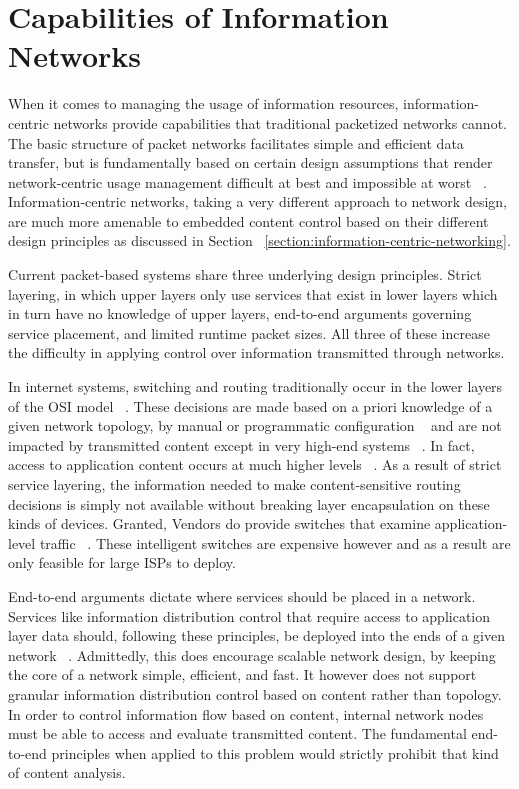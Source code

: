\section{Capabilities of Information Networks}
\label{section:capabilities}
When it comes to managing the usage of information resources,  information-centric networks provide capabilities that traditional packetized networks cannot.  The basic structure of packet networks facilitates simple and efficient data transfer, but is fundamentally based on certain design assumptions that render network-centric usage management difficult at best and impossible at worst ~\cite{Cl:88,SaReCl:84}.  Information-centric networks, taking a very different approach to network design, are much more amenable to embedded content control based on their different design principles as discussed in Section ~\ref{section:information-centric-networking}.

Current packet-based systems share three underlying design principles.  Strict layering, in which upper layers only use services that exist in lower layers which in turn have no knowledge of upper layers, end-to-end arguments governing service placement, and limited runtime packet sizes.  All three of these increase the difficulty in applying control over information transmitted through networks.

In internet systems, switching and routing traditionally occur in the lower layers of the OSI model ~\cite{Tanenbaum:1985:CN:536716}.  These decisions are made based on a priori knowledge of a given network topology, by manual or programmatic configuration ~\cite{proposal:openflow} and are not impacted by transmitted content except in very high-end systems ~\cite{cisco-6500}.  In fact, access to application content occurs at much higher levels ~\cite{Tanenbaum:1985:CN:536716}.  As a result of strict service layering, the information needed to make content-sensitive routing decisions is simply not available without breaking layer encapsulation on these kinds of devices.  Granted, Vendors do provide switches that examine application-level traffic ~\cite{cisco-6500}.  These intelligent switches are expensive however and as a result are only feasible for large ISPs to deploy. 

End-to-end arguments dictate where services should be placed in a network.  Services like information distribution control that require access to application layer data should, following these principles, be deployed into the ends of a given network ~\cite{SaReCl:84}.  Admittedly, this does encourage scalable network design, by keeping the core of a network simple, efficient, and fast. It however does not support granular information distribution control based on content rather than topology.  In order to control information flow based on content, internal network nodes must be able to access and evaluate transmitted content.  The fundamental end-to-end principles when applied to this problem would strictly prohibit that kind of content analysis.

